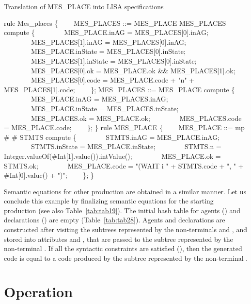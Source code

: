 \documentclass[preprint, prX]{revtex4}
\begin{document}
\begin{algorithm}[tbh]
\caption{Translation of MES\_PLACE into LISA specifications}
\label{alg:mp_lisa}
\scriptsize
\begin{algorithmic}[1]
\STATE rule Mes\_places \{
\STATE \ \ \ \ MES\_PLACES ::= MES\_PLACE MES\_PLACES compute \{
\STATE \ \ \ \ \ \ \ \ MES\_PLACE.inAG = MES\_PLACES[0].inAG;
\STATE \ \ \ \ \ \ \ \ MES\_PLACES[1].inAG = MES\_PLACES[0].inAG;
\STATE \ \ \ \ \ \ \ \ MES\_PLACE.inState = MES\_PLACES[0].inState;
\STATE \ \ \ \ \ \ \ \ MES\_PLACES[1].inState = MES\_PLACES[0].inState;
\STATE \ \ \ \ \ \ \ \ MES\_PLACES[0].ok = MES\_PLACE.ok \&\& MES\_PLACES[1].ok;
\STATE \ \ \ \ \ \ \ \ MES\_PLACES[0].code = MES\_PLACE.code + "n" + MES\_PLACES[1].code;
\STATE \ \ \ \ \};
\STATE MES\_PLACES ::=  MES\_PLACE compute \{
\STATE \ \ \ \ \ \ \ \ MES\_PLACE.inAG = MES\_PLACES.inAG;
\STATE \ \ \ \ \ \ \ \ MES\_PLACE.inState = MES\_PLACES.inState;
\STATE \ \ \ \ \ \ \ \ MES\_PLACES.ok = MES\_PLACE.ok;
\STATE \ \ \ \ \ \ \ \ MES\_PLACES.code = MES\_PLACE.code;
\STATE \ \ \ \ \};
\STATE \}
\STATE rule MES\_PLACE \{
\STATE \ \ \ \ MES\_PLACE ::= mp  \#   
 \#   STMTS  compute \{
\STATE \ \ \ \ \ \ \ \ STMTS.inAG = MES\_PLACE.inAG;
\STATE \ \ \ \ \ \ \ \ STMTS.inState = MES\_PLACE.inState;
\STATE \ \ \ \ \ \ \ \ STMTS.n = Integer.valueOf(\#Int[1].value()).intValue();
\STATE \ \ \ \ \ \ \ \ MES\_PLACE.ok = STMTS.ok;
\STATE \ \ \ \ \ \ \ \ MES\_PLACE.code = "(WAIT i " + STMTS.code + ", " + \#Int[0].value() + ")";
\STATE \ \ \ \ \};
\STATE \}
\end{algorithmic}
\normalsize
\end{algorithm}

Semantic equations for other production are obtained in a similar manner. Let us conclude this example by finalizing semantic equations for the starting production (see also Table~\ref{tab:tab19}). The initial hash table for agents () and declarations () are empty (Table~\ref{tab:tab28}). Agents and declarations are constructed after visiting the subtrees represented by the non-terminals  and , and stored into attributes  and  , that are passed to the subtree represented by the non-terminal  . If all the syntactic constraints are satisfied (), then the generated code is equal to a code produced by the subtree represented by the non-terminal .


\section{Operation}
\end{document}
